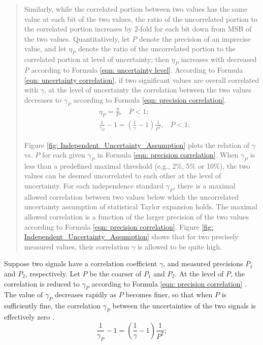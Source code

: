 \documentclass[twoside]{article}
\numberwithin{equation}{section}
\newcommand{\eqspace}{\;\;\;}
\begin{document}
\begin{quotation}
Similarly, while the correlated portion between two values has the same value at each bit of the two values, the ratio of the uncorrelated portion to the correlated portion increases by 2-fold for each bit down from MSB of the two values. 
Quantitatively, let $P$ denote the precision of an imprecise value, and let $\eta_{P}$ denote the ratio of the uncorrelated portion to the correlated portion at level of uncertainty; then $\eta_{P}$ increases with decreased $P$ according to Formula \eqref{eqn: uncertainty level}. 
According to Formula \eqref{eqn: uncertainty correlation}, if two significant values are overall correlated with $\gamma$, at the level of uncertainty the correlation between the two values decreases to $\gamma_P$ according to Formula \eqref{eqn: precision correlation}.
\begin{align}
\label{eqn: uncertainty level}
& \eta_{P} = \frac{\eta}{P}, \eqspace P < 1; \\
\label{eqn: precision correlation}
& \frac{1}{\gamma_{P}} - 1 = \left(\frac{1}{\gamma} -1\right) \frac{1}{P^2}, \eqspace P < 1;
\end{align}

Figure \ref{fig: Independent_Uncertainty_Assumption} plots the relation of $\gamma$ vs. $P$ for each given $\gamma_{P}$ in Formula \eqref{eqn: precision correlation}.  
When $\gamma_{P}$ is less than a predefined maximal threshold (e.g., 2\%, 5\% or 10\%), the two values can be deemed uncorrelated to each other at the level of uncertainty.  
For each independence standard $\gamma_{P}$, there is a maximal allowed correlation between two values below which the uncorrelated uncertainty assumption of statistical Taylor expansion holds.  
The maximal allowed correlation is a function of the larger precision of the two values according to Formula \eqref{eqn: precision correlation}.  
Figure \ref{fig: Independent_Uncertainty_Assumption} shows that for two precisely measured values, their correlation $\gamma$ is allowed to be quite high.  

\end{quotation}

\else	%

Suppose two signals have a correlation coefficient $\gamma$, and measured precisions $P_1$ and $P_2$, respectively.
Let $P$ be the coarser of $P_1$ and $P_2$.
At the level of $P$, the correlation is reduced to $\gamma_P$ according to Formula \eqref{eqn: precision correlation} \cite{Prev_Precision_Arithmetic}.
The  value of $\gamma_P$ decreases rapidly as $P$ becomes finer, so that when $P$ is sufficiently fine, the correlation $\gamma_P$ between the uncertainties of the two signals is effectively zero \cite{Prev_Precision_Arithmetic}.
\begin{equation}
\label{eqn: precision correlation}
\frac{1}{\gamma_{P}} - 1 = \left(\frac{1}{\gamma} -1\right) \frac{1}{P^2};
\end{equation}
\end{document}
